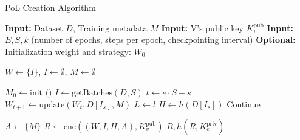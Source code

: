 \begin{algorithm}\label{alg:pol_creation}
    \caption{PoL Creation Algorithm}
    \begin{algorithmic}
    \State\textbf{Input:} Dataset $D$, Training metadata $M$
    \State\textbf{Input:} V's public key $K^{\text{pub}}_v$
    \State\textbf{Input:} $E, S, k$ (number of epochs, steps per epoch, checkpointing interval)
    \State\textbf{Optional:} Initialization weight and strategy: $W_0$
    
    \State$W \gets \{I\}$, $I \gets \emptyset$, $M \gets \emptyset$
    
        \State$M_0 \gets \text{init ()}$
    \EndIf     %
     
        \State$I \gets \text{getBatches}(D, S)$
         
            \State$t \gets e \cdot S + s$
            \State$W_{t+1} \gets \text{update}(W_t, D[I_s], M)$
            \State$L \gets l$ 
            \State$H \gets h(D[I_s])$ 
                \State Continue %
            \EndIf %
        \EndFor %
    \EndFor %
    
    \State$A \gets \{M\}$
    \State$R \gets \text{enc}((W, I, H, A), K^{\text{pub}}_v)$
    \State\Return$R, h(R, K^{\text{priv}}_e)$
    \end{algorithmic}
\end{algorithm}